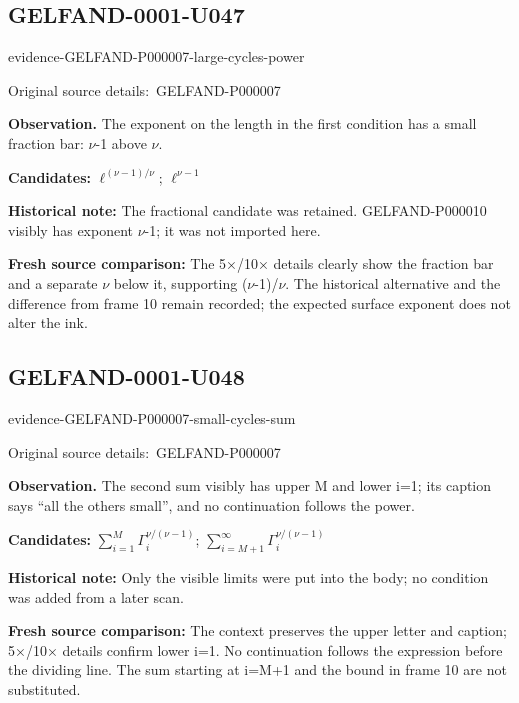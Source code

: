 \documentclass[11pt]{article}
\newcommand{\EvidenceBlock}[4]{%
 \par\smallskip\noindent\begin{minipage}{\linewidth}
 \begin{minipage}[t]{.47\linewidth}\vspace{0pt}\centering
 \csname evidence-#1-#2\endcsname\par
 {\scriptsize\SourceCropCaption\ #1}\par
 \end{minipage}\hfill
 \begin{minipage}[t]{.49\linewidth}\vspace{0pt}\raggedright
 {\small\color{orange!65!black}\textbf{#4} #3}\par
 \end{minipage}
 \end{minipage}\par\smallskip}
\newcommand{\SourceCropCaption}{Original source details:}\newcommand{\ReadingCaption}{Uncertain reading.}\newcommand{\IncompleteCaption}{Undeciphered passage.}\newcommand{\DiagramCaption}{Diagram and typed description.}
\begin{document}
\subsection*{GELFAND-0001-U047}
\EvidenceBlock{GELFAND-P000007}{large-cycles-power}{The exponent on the length in the first condition has a small fraction bar: \(\nu\)-1 above \(\nu\).}{Observation.}
\par\smallskip\noindent\textbf{Candidates: } \(\ell^{(\nu-1)/\nu}\); \(\ell^{\nu-1}\)\par
\par\smallskip\noindent\textbf{Historical note: } The fractional candidate was retained. GELFAND-P000010 visibly has exponent \(\nu\)-1; it was not imported here.\par
\par\smallskip\noindent\textbf{Fresh source comparison: } The 5×/10× details clearly show the fraction bar and a separate \(\nu\) below it, supporting (\(\nu\)-1)/\(\nu\). The historical alternative and the difference from frame 10 remain recorded; the expected surface exponent does not alter the ink.\par

\subsection*{GELFAND-0001-U048}
\EvidenceBlock{GELFAND-P000007}{small-cycles-sum}{The second sum visibly has upper M and lower i=1; its caption says “all the others small”, and no continuation follows the power.}{Observation.}
\par\smallskip\noindent\textbf{Candidates: } \(\sum_{i=1}^{M}\Gamma_i^{\nu/(\nu-1)}\); \(\sum_{i=M+1}^{\infty}\Gamma_i^{\nu/(\nu-1)}\)\par
\par\smallskip\noindent\textbf{Historical note: } Only the visible limits were put into the body; no condition was added from a later scan.\par
\par\smallskip\noindent\textbf{Fresh source comparison: } The context preserves the upper letter and caption; 5×/10× details confirm lower i=1. No continuation follows the expression before the dividing line. The sum starting at i=M+1 and the bound in frame 10 are not substituted.\par
\end{document}
